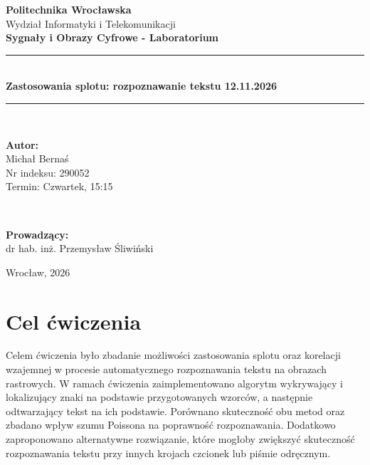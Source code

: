 \documentclass{article}
\begin{document}
\begin{titlepage}
  \begin{center}
    {\large \textbf{Politechnika Wrocławska}} \\[0.3cm]
    {\normalsize Wydział Informatyki i Telekomunikacji} \\[2cm]

    {\Large \textbf{Sygnały i Obrazy Cyfrowe - Laboratorium}} \\[1.5cm]

    \rule{\textwidth}{0.4mm} \\[0.4cm]
    {\huge \bfseries Zastosowania splotu: rozpoznawanie tekstu 12.11.2026} \\[0.4cm]
    \rule{\textwidth}{0.4mm} \\[2.5cm]

    \begin{minipage}{0.48\textwidth}
      \begin{flushleft}
        \textbf{Autor:} \\
        Michał Bernaś \\
        Nr indeksu: 290052 \\
        Termin: Czwartek, 15:15
      \end{flushleft}
    \end{minipage}
    ~
    \begin{minipage}{0.48\textwidth}
      \begin{flushright}
        \textbf{Prowadzący:} \\
        dr hab. inż. Przemysław Śliwiński
      \end{flushright}
    \end{minipage}

    \vfill

    {\large Wrocław, 2026}
  \end{center}
\end{titlepage}

\clearpage

\section{Cel ćwiczenia}
Celem ćwiczenia było zbadanie możliwości zastosowania splotu oraz korelacji wzajemnej w procesie automatycznego rozpoznawania tekstu na obrazach rastrowych. W ramach ćwiczenia zaimplementowano algorytm wykrywający i lokalizujący znaki na podstawie przygotowanych wzorców, a następnie odtwarzający tekst na ich podstawie. Porównano skuteczność obu metod oraz zbadano wpływ szumu Poissona na poprawność rozpoznawania. Dodatkowo zaproponowano alternatywne rozwiązanie, które mogłoby zwiększyć skuteczność rozpoznawania tekstu przy innych krojach czcionek lub piśmie odręcznym.
\end{document}
